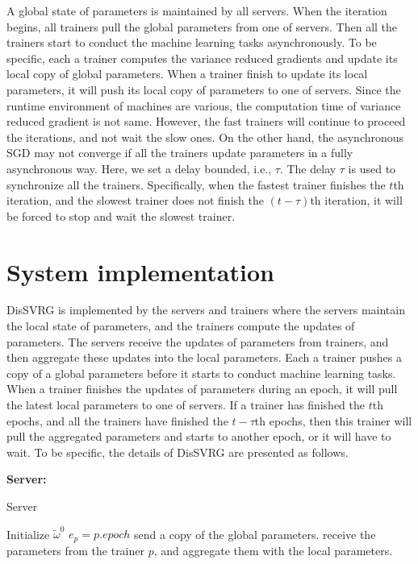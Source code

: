 \documentclass[10pt,journal,finalsubmission,compsoc]{IEEEtran}
\begin{document}
A global state of parameters is maintained by all servers. When the iteration begins, all trainers pull the global parameters from one of servers. Then all the trainers start to conduct the machine learning tasks asynchronously. To be specific, each a trainer computes the variance reduced gradients and update its local copy of global parameters.   When a trainer finish to update its local parameters, it will push its local copy of parameters to one of servers. Since the runtime environment of machines are various, the computation time of variance reduced gradient  is not same. However, the fast trainers will continue to proceed the iterations, and  not wait the slow ones. On the other hand, the asynchronous SGD may not converge if all the trainers update parameters in a fully asynchronous way. Here, we set a delay bounded, i.e., $\tau$. The delay $\tau$ is used to synchronize all the trainers. Specifically, when the fastest trainer finishes the $t$th iteration, and the slowest trainer does not finish the $(t-\tau)$th iteration,  it will be forced to stop and wait the slowest trainer. 

\section{System implementation}
\label{implementation}
DisSVRG is implemented by the servers and trainers where the servers maintain the local state of parameters, and the trainers compute the updates of parameters. The servers receive the updates of parameters from trainers, and then aggregate these updates into the local parameters. Each a trainer pushes a copy of a global parameters before it starts to conduct machine learning tasks. When a trainer finishes the updates of parameters during an epoch, it will pull the latest local parameters to one of servers. If a trainer has finished the $t$th epochs, and all the trainers have finished the $t-\tau$th epochs, then this trainer will pull the aggregated parameters and starts to another epoch, or it will have to wait. To be specific, the details of DisSVRG are presented as follows.

\textbf{Server:} 



\begin{algorithm}[t]
    \caption{Server}
    \label{algorithm_dis_svrg_server}
    \begin{algorithmic}[1]
        \State Initialize $\tilde{\omega}^0$
                \State $e_p=p.epoch$
                    \State send a copy of the global parameters.
                \EndIf
            \EndIf
                \State receive the parameters from the trainer $p$, and aggregate them with the local parameters.
            \EndIf
        \EndWhile
    \end{algorithmic}
\end{algorithm}
\end{document}
